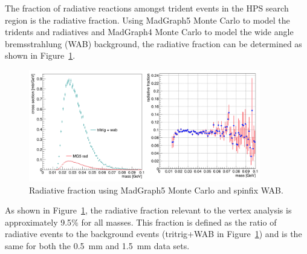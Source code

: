The fraction of radiative reactions amongst trident events in the HPS search region is the radiative fraction. Using MadGraph5 Monte Carlo to model the tridents and radiatives and MadGraph4 Monte Carlo to model the wide angle bremsstrahlung (WAB) background, the radiative fraction can be determined as shown in Figure~\ref{fig:radFrac}.

\begin{figure}[H]
  \centering
      \includegraphics[width=0.9\textwidth]{pics/searching/radFrac.png}
  \caption[Radiative fraction from Monte Carlo]{Radiative fraction using MadGraph5 Monte Carlo and spinfix WAB.}
  \label{fig:radFrac}
\end{figure} 

As shown in Figure~\ref{fig:radFrac}, the radiative fraction relevant to the vertex analysis is approximately 9.5$\%$ for all masses. This fraction is defined as the ratio of radiative events to the background events (tritrig+WAB in Figure~\ref{fig:radFrac}) and is the same for both the 0.5~mm and 1.5~mm data sets.
